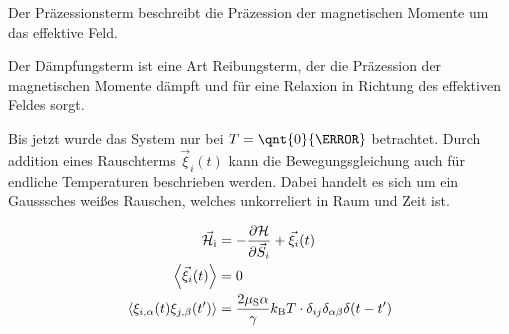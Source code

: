 \documentclass[main.tex]{subfiles}
\begin{document}
Der Präzessionsterm beschreibt die Präzession der magnetischen Momente um das effektive Feld.

Der Dämpfungsterm ist eine Art Reibungsterm, der die Präzession der magnetischen Momente dämpft und für eine Relaxion in Richtung des effektiven Feldes sorgt.

Bis jetzt wurde das System nur bei \(T = \qnt{0}{\kelvin}\) betrachtet.
Durch addition eines Rauschterms \(\vec{\xi}_i(t)\) kann die Bewegungsgleichung auch für endliche Temperaturen beschrieben werden.
Dabei handelt es sich um ein Gausssches weißes Rauschen, welches unkorreliert in Raum und Zeit ist.

\begin{align}
	\vec{\mathcal{H}}_{\text{i}} 
	& = -\pdv{\mathcal{H}}{\vec{S}_i} + \vec{\xi}_i(t) \\
	\expval{\vec{\xi}_i(t)} & = 0 \\
	\expval{\xi_{i,\alpha}(t) \xi_{j,\beta}(t')} 
	& = \frac{2\mu_\text{S} \alpha}{\gamma}k_\text{B} T \cdot \delta_{ij} \delta_{\alpha \beta}	\delta(t-t')
\end{align}
\end{document}
